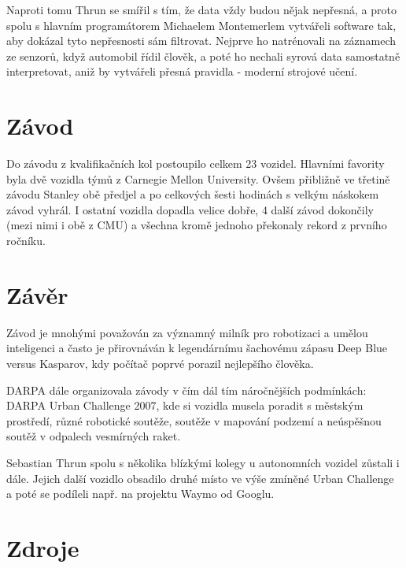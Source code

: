 \documentclass[12pt]{article}
\begin{document}
Naproti tomu Thrun se smířil s tím, že data vždy budou nějak nepřesná, a proto spolu s hlavním programátorem
Michaelem Montemerlem vytvářeli software tak, aby dokázal tyto nepřesnosti sám filtrovat. Nejprve ho
natrénovali na záznamech ze senzorů, když automobil řídil člověk, a poté ho nechali syrová data samostatně
interpretovat, aniž by vytvářeli přesná pravidla - moderní strojové učení.

\section{Závod}
Do závodu z kvalifikačních kol postoupilo celkem 23 vozidel. Hlavními favority byla dvě vozidla týmů
z Carnegie Mellon University. Ovšem přibližně ve třetině závodu Stanley obě předjel a po celkových šesti
hodinách s velkým náskokem závod vyhrál. I ostatní vozidla dopadla velice dobře, 4 další závod dokončily
(mezi nimi i obě z CMU) a všechna kromě jednoho překonaly rekord z prvního ročníku.

\section{Závěr}
Závod je mnohými považován za významný milník pro robotizaci a umělou inteligenci a často je přirovnáván
k legendárnímu šachovému zápasu Deep Blue versus Kasparov, kdy počítač poprvé porazil nejlepšího člověka. 

DARPA dále organizovala závody v čím dál tím náročnějších podmínkách: DARPA Urban Challenge 2007,
kde si vozidla musela poradit s městským prostředí, různé robotické soutěže, soutěže v mapování podzemí
a neúspěšnou soutěž v odpalech vesmírných raket.

Sebastian Thrun spolu s několika blízkými kolegy u autonomních vozidel zůstali i dále. Jejich další vozidlo
 obsadilo druhé místo ve výše zmíněné Urban Challenge a poté se podíleli např. na projektu Waymo
od Googlu. 

\section{Zdroje}
\end{document}
